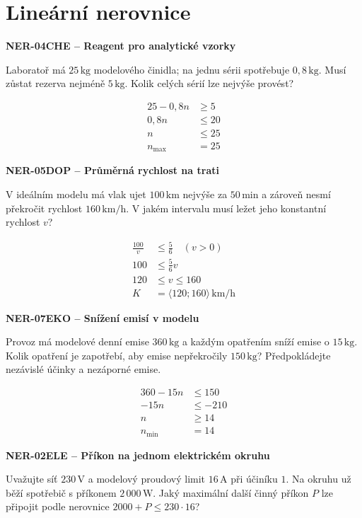 \documentclass[11pt,a4paper]{article}
\begin{document}
\section{Lineární nerovnice}
\par\medskip\noindent
\textbf{NER-04}\quad\textbf{CHE -- Reagent pro analytické vzorky}\par
Laboratoř má $25\,\mathrm{kg}$ modelového činidla; na jednu sérii spotřebuje $0{,}8\,\mathrm{kg}$. Musí zůstat rezerva nejméně $5\,\mathrm{kg}$. Kolik celých sérií lze nejvýše provést?
\par\[\begin{aligned}
25-0{,}8n&\ge5\\0{,}8n&\le20\\n&\le25\\n_{\max}&=25
\end{aligned}\]
\par\medskip\noindent
\textbf{NER-05}\quad\textbf{DOP -- Průměrná rychlost na trati}\par
V ideálním modelu má vlak ujet $100\,\mathrm{km}$ nejvýše za $50\,\mathrm{min}$ a zároveň nesmí překročit rychlost $160\,\mathrm{km/h}$. V jakém intervalu musí ležet jeho konstantní rychlost $v$?
\par\[\begin{aligned}
\frac{100}{v}&\le\frac56\quad (v>0)\\100&\le\frac56v\\120&\le v\le160\\K&=\langle120;160\rangle\,\mathrm{km/h}
\end{aligned}\]
\par\medskip\noindent
\textbf{NER-07}\quad\textbf{EKO -- Snížení emisí v modelu}\par
Provoz má modelové denní emise $360\,\mathrm{kg}$ a každým opatřením sníží emise o $15\,\mathrm{kg}$. Kolik opatření je zapotřebí, aby emise nepřekročily $150\,\mathrm{kg}$? Předpokládejte nezávislé účinky a nezáporné emise.
\par\[\begin{aligned}
360-15n&\le150\\-15n&\le-210\\n&\ge14\\n_{\min}&=14
\end{aligned}\]
\par\medskip\noindent
\textbf{NER-02}\quad\textbf{ELE -- Příkon na jednom elektrickém okruhu}\par
Uvažujte síť $230\,\mathrm V$ a modelový proudový limit $16\,\mathrm A$ při účiníku $1$. Na okruhu už běží spotřebič s příkonem $2\,000\,\mathrm W$. Jaký maximální další činný příkon $P$ lze připojit podle nerovnice $2000+P\le230\cdot16$?
\end{document}
